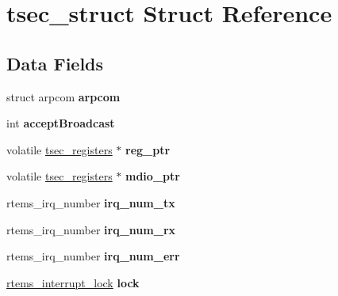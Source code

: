 \hypertarget{structtsec__struct}{}\section{tsec\+\_\+struct Struct Reference}
\label{structtsec__struct}
\subsection*{Data Fields}
\begin{DoxyCompactItemize}
\item 
\mbox{\label{structtsec__struct_a1d0ac0e3503f9d1bc60d483680a51dc5}} 
struct arpcom {\bfseries arpcom}
\item 
\mbox{\label{structtsec__struct_ac24f4eabcd4d5c396e4046393d91c028}} 
int {\bfseries accept\+Broadcast}
\item 
\mbox{\label{structtsec__struct_a14a7f2bd17f0d2fc7383f83de3dc85c6}} 
volatile \mbox{\hyperlink{structtsec__registers}{tsec\+\_\+registers}} $\ast$ {\bfseries reg\+\_\+ptr}
\item 
\mbox{\label{structtsec__struct_abce3fa17dacf7032496402fb97e17283}} 
volatile \mbox{\hyperlink{structtsec__registers}{tsec\+\_\+registers}} $\ast$ {\bfseries mdio\+\_\+ptr}
\item 
\mbox{\label{structtsec__struct_ad68c3d7f572eef71fc8b5058ba958d2f}} 
rtems\+\_\+irq\+\_\+number {\bfseries irq\+\_\+num\+\_\+tx}
\item 
\mbox{\label{structtsec__struct_af196f32ad01e926a876fc5708aa1b285}} 
rtems\+\_\+irq\+\_\+number {\bfseries irq\+\_\+num\+\_\+rx}
\item 
\mbox{\label{structtsec__struct_aeaa9f1b1222e33266e8f90236abc9cf0}} 
rtems\+\_\+irq\+\_\+number {\bfseries irq\+\_\+num\+\_\+err}
\item 
\mbox{\label{structtsec__struct_a7e26e637fe79f1bcb48cf53f474005ed}} 
\mbox{\hyperlink{group__ClassicINTRLocks_ga7d4b54b01fd1507aa842d5fbc7b11177}{rtems\+\_\+interrupt\+\_\+lock}} {\bfseries lock}
\item 

\end{DoxyCompactItemize}
